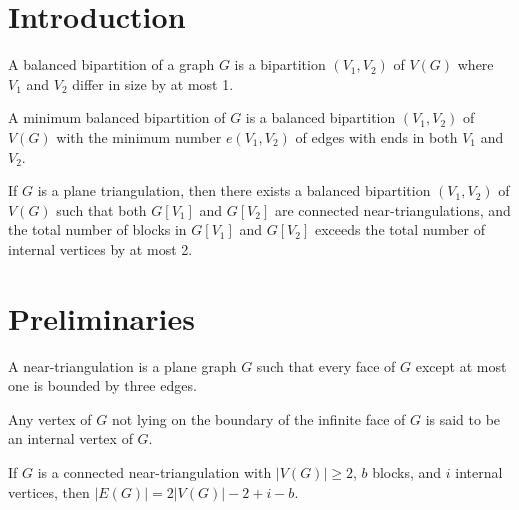 
\section{Introduction}

\begin{definition}
A balanced bipartition of a graph $G$ is a bipartition $(V_1, V_2)$ of $V(G)$ where $V_1$ and $V_2$ differ in size by at most 1.
\end{definition}

\begin{definition}
A minimum balanced bipartition of $G$ is a balanced bipartition $(V_1, V_2)$ of $V(G)$ with the minimum number $e(V_1, V_2)$ of edges with ends in both $V_1$ and $V_2$. 
\end{definition}

\begin{theorem}
\label{thm:main}
If $G$ is a plane triangulation, then there exists a balanced bipartition $(V_1, V_2)$ of $V(G)$ such that both $G[V_1]$ and $G[V_2]$ are connected near-triangulations, and the total number of blocks in $G[V_1]$ and $G[V_2]$ exceeds the total number of internal vertices by at most 2.
\end{theorem}

\section{Preliminaries}

\begin{definition}
A near-triangulation is a plane graph $G$ such that every face of $G$ except at most one is bounded by three edges.
\end{definition}

\begin{definition}
Any vertex of $G$ not lying on the boundary of the infinite face of $G$ is said to be an internal vertex of $G$.
\end{definition}

\begin{proposition}
\label{prop:edges_cpnt}
If $G$ is a connected near-triangulation with $|V(G)| \geq 2$, $b$ blocks, and $i$ internal vertices, then $|E(G)| = 2|V(G)|-2+i-b$.
\end{proposition}

